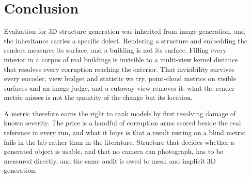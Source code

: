 \section{Conclusion}

Evaluation for {3D} structure generation was inherited from image generation, and the
inheritance carries a specific defect. Rendering a structure and embedding the renders
measures its surface, and a building is not its surface. Filling every interior in a corpus
of real buildings is invisible to a multi-view kernel distance that resolves every
corruption reaching the exterior. That invisibility survives every encoder, view
budget and statistic we try, point-cloud metrics on visible surfaces and an image judge,
and a cutaway view removes it: what the render metric misses is not the quantity of the
change but its location.

A metric therefore earns the right to rank models by first resolving damage of known
severity. The price is a handful of corruption arms scored beside the real reference in
every run, and what it buys is that a result resting on a blind metric fails in the lab
rather than in the literature. Structure that decides whether a generated
object is usable, and that no camera can photograph, has to be measured directly,\label{endofmain} and the
same audit is owed to mesh and implicit {3D} generation.
